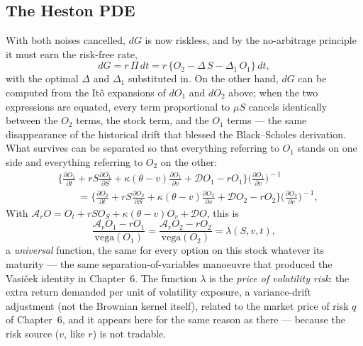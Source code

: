 \subsection{The Heston PDE}

With both noises cancelled, $dG$ is now riskless, and by the no-arbitrage principle it must earn the risk-free rate,
\begin{equation}
dG = r\,\Pi\, dt = r\,\bigl\{O_2 - \Delta\, S - \Delta_1\, O_1\bigr\}\,dt,
\end{equation}
with the optimal $\Delta$ and $\Delta_1$ substituted in.
On the other hand, $dG$ can be computed from the It\^o expansions of $dO_1$ and $dO_2$ above; when the two expressions are equated, every term proportional to $\mu S$ cancels identically between the $O_2$ terms, the stock term, and the $O_1$ terms --- the same disappearance of the historical drift that blessed the Black--Scholes derivation.
What survives can be separated so that everything referring to $O_1$ stands on one side and everything referring to $O_2$ on the other:
\begin{equation}\begin{split}
&\biggl\{\frac{\partial O_1}{\partial t} + rS\frac{\partial O_1}{\partial S} + \kappa(\theta - v)\frac{\partial O_1}{\partial v} + \mathcal{D} O_1 - r O_1\biggr\}\biggl(\frac{\partial O_1}{\partial v}\biggr)^{\!-1}\\
&\qquad= \biggl\{\frac{\partial O_2}{\partial t} + rS\frac{\partial O_2}{\partial S} + \kappa(\theta - v)\frac{\partial O_2}{\partial v} + \mathcal{D} O_2 - r O_2\biggr\}\biggl(\frac{\partial O_2}{\partial v}\biggr)^{\!-1},
\end{split}\end{equation}
With $\mathcal A_r O=O_t+rSO_S+\kappa(\theta-v)O_v+\mathcal D O$, this is
\begin{equation}
\frac{\mathcal A_r O_1 - r O_1}{\mathrm{vega}(O_1)} = \frac{\mathcal A_r O_2 - r O_2}{\mathrm{vega}(O_2)} = \lambda(S,v,t),
\end{equation}
a \emph{universal} function, the same for every option on this stock whatever its maturity --- the same separation-of-variables manoeuvre that produced the Vasi\v{c}ek identity in Chapter~6.
The function $\lambda$ is the \emph{price of volatility risk}: the extra return demanded per unit of volatility exposure, a variance-drift adjustment (not the Brownian kernel itself), related to the market price of risk $q$ of Chapter~6, and it appears here for the same reason as there --- because the risk source ($v$, like $r$) is not tradable.

